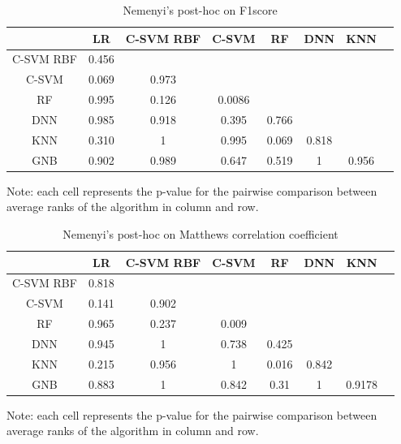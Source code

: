 \documentclass[a4paper,12pt]{article}
\numberwithin{equation}{section}
\begin{document}
\begin{appendices}
\begin{table}[H]
\begin{center}
\caption{Nemenyi's post-hoc on F1score}
\begin{threeparttable}
\begin{tabular}{ |c|c|c|c|c|c|c|c| } 
 \hline
  & LR & C-SVM RBF & C-SVM & RF & DNN & KNN  \\ 
 \hline 
 C-SVM RBF & 0.456 & & & & & \\[1pt]
 C-SVM  & 0.069 & 0.973 & & & &  \\[1pt]
 RF & 0.995 & 0.126 & 0.0086& & & \\[1pt]
 DNN & 0.985 & 0.918 & 0.395 & 0.766 & & \\[1pt]
 KNN & 0.310 & 1 & 0.995 & 0.069 & 0.818 & \\[1pt]
 GNB & 0.902 & 0.989 & 0.647 & 0.519 & 1 & 0.956 \\[1pt]
 \hline

\end{tabular}
\begin{tablenotes}
\small
\item   Note: each cell represents the p-value for the pairwise comparison between average ranks of the algorithm in column and row.
\end{tablenotes}
\end{threeparttable}
\label{table:6}
\end{center}
\end{table}

\begin{table}[H]
\begin{center}
\caption{Nemenyi's post-hoc on Matthews correlation coefficient}
\begin{threeparttable}
\begin{tabular}{ |c|c|c|c|c|c|c|c| } 
 \hline
  & LR & C-SVM RBF & C-SVM & RF & DNN & KNN  \\ 
 \hline 
 C-SVM RBF & 0.818 & & & & & \\[1pt]
 C-SVM  & 0.141 & 0.902 & & & &  \\[1pt]
 RF & 0.965 & 0.237 & 0.009& & & \\[1pt]
 DNN & 0.945 & 1 & 0.738 & 0.425 & & \\[1pt]
 KNN & 0.215 & 0.956 & 1 & 0.016 & 0.842 & \\[1pt]
 GNB & 0.883 & 1 & 0.842 & 0.31 & 1 & 0.9178 \\[1pt]
 \hline

\end{tabular}
\begin{tablenotes}
\small
\item   Note: each cell represents the p-value for the pairwise comparison between average ranks of the algorithm in column and row.
\end{tablenotes}
\end{threeparttable}
\label{table:11}
\end{center}
\end{table}


\end{appendices}
\end{document}
